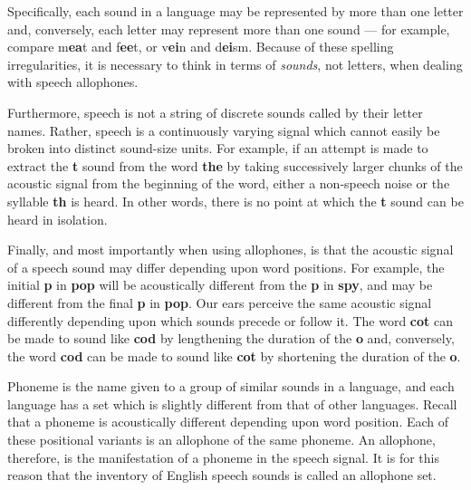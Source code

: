 Specifically, each sound in a language may be represented by more than one letter and, conversely, each letter may represent more than one sound --- for example, compare m\textbf{ea}t and f\textbf{ee}t, or v\textbf{ei}n and d\textbf{ei}sm. Because of these spelling irregularities, it is necessary to think in terms of \textit{sounds}, not letters, when dealing with speech allophones.

Furthermore, speech is not a string of discrete sounds called by their letter names. Rather, speech is a continuously varying signal which cannot easily be broken into distinct sound-size units. For example, if an attempt is made to extract the \textbf{t} sound from the word \textbf{the} by taking successively larger chunks of the acoustic signal from the beginning of the word, either a non-speech noise or the syllable \textbf{th} is heard. In other words, there is no point at which the \textbf{t} sound can be heard in isolation.

Finally, and most importantly when using allophones, is that the acoustic signal of a speech sound may differ depending upon word positions. For example, the initial \textbf{p} in \textbf{pop} will be acoustically different from the \textbf{p} in \textbf{spy}, and may be different from the final \textbf{p} in \textbf{pop}. Our ears perceive the same acoustic signal differently depending upon which sounds precede or follow it. The word \textbf{cot} can be made to sound like \textbf{cod} by lengthening the duration of the \textbf{o} and, conversely, the word \textbf{cod} can be made to sound like \textbf{cot} by shortening the duration of the \textbf{o}.

Phoneme is the name given to a group of similar sounds in a language, and each language has a set which is slightly different from that of other languages. Recall that a phoneme is acoustically different depending upon word position. Each of these positional variants is an allophone of the same phoneme. An allophone, therefore, is the manifestation of a phoneme in the speech signal. It is for this reason that the inventory of English speech sounds is called an allophone set.

